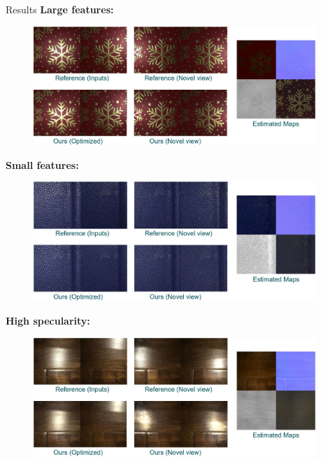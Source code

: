 \documentclass[final]{beamer}
\newlength{\sepwid}
\newlength{\twocolwid}
\begin{document}
\begin{frame}[t]
\begin{columns}[t]
    \begin{column}{\sepwid}\end{column} %
    \begin{column}{\twocolwid} %
        \begin{block}{Results}
            \large\textbf{Large features:}
            \begin{figure}
				\centering
				\includegraphics[width=14in]{results/card.jpg}
            \end{figure}
            

            \large\textbf{Small features:}
			\begin{figure}
				\centering
				\includegraphics[width=14in]{results/leather.jpg}
			\end{figure}
			

            \large\textbf{High specularity:}
			\begin{figure}
				\centering
				\includegraphics[width=14in]{results/wood.jpg}
			\end{figure}
					

\end{block}
\end{column}
\end{columns}
\end{frame}
\end{document}
